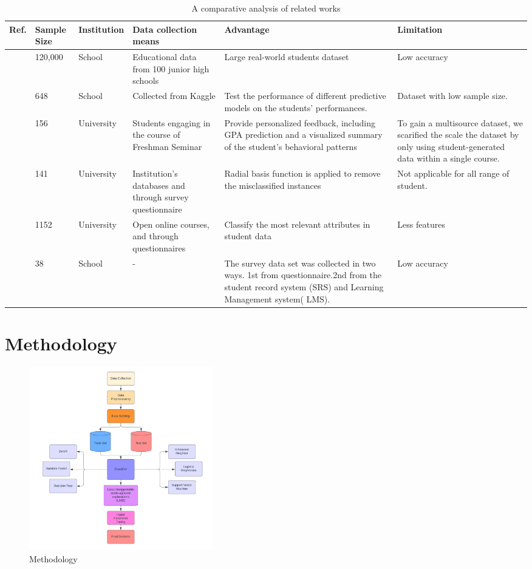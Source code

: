 \documentclass[conference]{IEEEtran}
\begin{document}
\FloatBarrier
\begin{table}[hbt!]
\label{table1}
\centering
\caption{A comparative analysis of related works}
\begin{tabular} {|p{1.2cm}|p{1.2cm}|p{1.2cm}|p{1.2cm}|p{1.2cm}|p{1.2cm}| }
\hline
Ref.& Sample Size & Institution& Data collection means&Advantage &Limitation\\\hline
\cite{r4} & 120,000 & School  &  Educational data from 100 junior high schools &  Large real-world students dataset & Low accuracy\\ \hline 
\cite{r5}& 648 & School  & Collected from Kaggle &Test the performance of different
predictive models on the students’ performances.
&Dataset with low sample size.\\ \hline
\cite{r6} & 156 & University  & Students engaging in the course of Freshman Seminar &Provide personalized feedback, including GPA prediction and a visualized summary of the student's behavioral patterns&To gain a multisource dataset, we scarified the scale the dataset by only using student-generated data within a single course. \\ \hline
\cite{r7}& 141 & University  & Institution's databases and through survey questionnaire&Radial basis function is applied to remove the misclassified instances&Not applicable for all range of student.\\ \hline
\cite{r8}& 1152 & University  & Open online courses, and through questionnaires &Classify the most relevant attributes in student data&Less features \\ \hline
\cite{r9} & 38 & School  & - &The survey data set was collected in two ways. 1st from questionnaire.2nd from the student record system (SRS) and Learning Management system( LMS).&Low accuracy \\ \hline
\end{tabular}
\end{table}

\section{Methodology}
\begin{figure}[H]
    \centering
    \includegraphics[width=8cm]{fig1.png}
    \caption{Methodology}
    \label{fig:1}
\end{figure}
\end{document}
